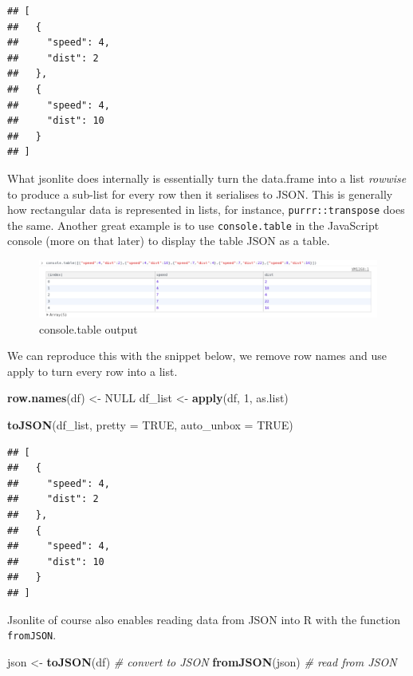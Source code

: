 \documentclass[
]{krantz}
\makeatletter
\newenvironment{Shaded}{\begin{snugshade}}{\end{snugshade}}
\newcommand{\CommentTok}[1]{\textcolor[rgb]{0.37,0.37,0.37}{\textit{#1}}}
\newcommand{\DataTypeTok}[1]{\textcolor[rgb]{0.27,0.27,0.27}{#1}}
\newcommand{\DecValTok}[1]{\textcolor[rgb]{0.06,0.06,0.06}{#1}}
\newcommand{\KeywordTok}[1]{\textcolor[rgb]{0.27,0.27,0.27}{\textbf{#1}}}
\newcommand{\NormalTok}[1]{#1}
\newcommand{\OtherTok}[1]{\textcolor[rgb]{0.37,0.37,0.37}{#1}}
\newcommand{\StringTok}[1]{\textcolor[rgb]{0.5,0.5,0.5}{#1}}
\newenvironment{kframe}{%
\medskip{}
\setlength{\fboxsep}{.8em}
 \def\at@end@of@kframe{}%
 \ifinner\ifhmode%
  \def\at@end@of@kframe{\end{minipage}}%
  \begin{minipage}{\columnwidth}%
 \fi\fi%
 \def\FrameCommand##1{\hskip\@totalleftmargin \hskip-\fboxsep
 \colorbox{shadecolor}{##1}\hskip-\fboxsep
     \hskip-\linewidth \hskip-\@totalleftmargin \hskip\columnwidth}%
 \MakeFramed {\advance\hsize-\width
   \@totalleftmargin\z@ \linewidth\hsize
   \@setminipage}}%
 {\par\unskip\endMakeFramed%
 \at@end@of@kframe}
\renewenvironment{Shaded}{\begin{kframe}}{\end{kframe}}
\makeatother
\begin{document}
\begin{verbatim}
## [
##   {
##     "speed": 4,
##     "dist": 2
##   },
##   {
##     "speed": 4,
##     "dist": 10
##   }
## ]
\end{verbatim}

What jsonlite does internally is essentially turn the data.frame into a list \emph{rowwise} to produce a sub-list for every row then it serialises to JSON. This is generally how rectangular data is represented in lists, for instance, \texttt{purrr::transpose} does the same. Another great example is to use \texttt{console.table} in the JavaScript console (more on that later) to display the table JSON as a table.

\begin{figure}
\centering
\includegraphics{images/console-table.png}
\caption{console.table output}
\end{figure}

We can reproduce this with the snippet below, we remove row names and use apply to turn every row into a list.

\begin{Shaded}
\begin{Highlighting}[]
\KeywordTok{row.names}\NormalTok{(df) <{-}}\StringTok{ }\OtherTok{NULL}
\NormalTok{df\_list <{-}}\StringTok{ }\KeywordTok{apply}\NormalTok{(df, }\DecValTok{1}\NormalTok{, as.list)}

\KeywordTok{toJSON}\NormalTok{(df\_list, }\DataTypeTok{pretty =} \OtherTok{TRUE}\NormalTok{, }\DataTypeTok{auto\_unbox =} \OtherTok{TRUE}\NormalTok{)}
\end{Highlighting}
\end{Shaded}

\begin{verbatim}
## [
##   {
##     "speed": 4,
##     "dist": 2
##   },
##   {
##     "speed": 4,
##     "dist": 10
##   }
## ]
\end{verbatim}

Jsonlite of course also enables reading data from JSON into R with the function \texttt{fromJSON}.

\begin{Shaded}
\begin{Highlighting}[]
\NormalTok{json <{-}}\StringTok{ }\KeywordTok{toJSON}\NormalTok{(df) }\CommentTok{\# convert to JSON}
\KeywordTok{fromJSON}\NormalTok{(json) }\CommentTok{\# read from JSON}
\end{Highlighting}
\end{Shaded}
\end{document}
